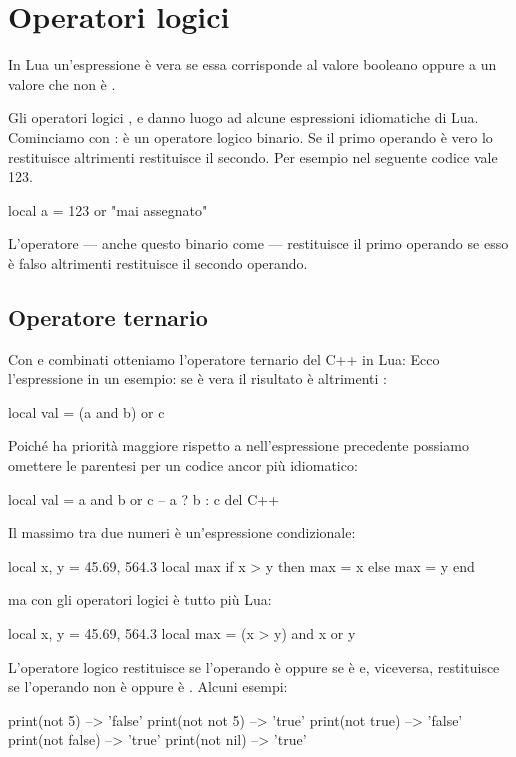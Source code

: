 

\chapter{Operatori logici}

In Lua un'espressione è vera se essa corrisponde al valore booleano 
oppure a un valore che non è .

Gli operatori logici ,  e  danno luogo ad alcune
espressioni idiomatiche di Lua. Cominciamo con : è un operatore logico
binario. Se il primo operando è vero lo restituisce altrimenti restituisce il
secondo. Per esempio nel seguente codice  vale 123.
\begin{lines}
local a = 123 or "mai assegnato"
\end{lines}

L'operatore  --- anche questo binario come  --- restituisce il
primo operando se esso è falso altrimenti restituisce il secondo operando.

\section{Operatore ternario}
\label{secFondOperatoreTernario}

Con  e  combinati otteniamo l'operatore ternario del C++ in
Lua: Ecco l'espressione in un esempio: se  è vera il risultato è 
altrimenti :
\begin{lines}
local val = (a and b) or c
\end{lines}

Poiché  ha priorità maggiore rispetto a  nell'espressione
precedente possiamo omettere le parentesi per un codice ancor più idiomatico:
\begin{lines}
local val = a and b or c -- a ? b : c del C++
\end{lines}

Il massimo tra due numeri è un'espressione condizionale:
\begin{lines}
local x, y = 45.69, 564.3
local max
if x > y then
    max = x
else
    max = y
end
\end{lines}
ma con gli operatori logici è tutto più Lua:
\begin{lines}
local x, y = 45.69, 564.3
local max = (x > y) and x or y
\end{lines}

L'operatore logico  restituisce  se l'operando è 
oppure se è  e, viceversa, restituisce  se l'operando non
è  oppure è . Alcuni esempi:
\begin{lines}
print(not 5)       --> 'false'
print(not not 5)   --> 'true'
print(not true)    --> 'false'
print(not false)   --> 'true'
print(not nil)     --> 'true'
\end{lines}

